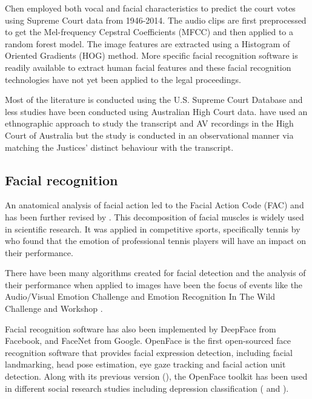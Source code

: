 \documentclass{monashthesis}
\begin{document}
Chen \autocite*{chen2018justice} employed both vocal and facial characteristics to predict the court votes using Supreme Court data from 1946-2014. The audio clips are first preprocessed to get the Mel-frequency Cepstral Coefficients (MFCC) and then applied to a random forest model. The image features are extracted using a Histogram of Oriented Gradients (HOG) method. More specific facial recognition software is readily available to extract human facial features and these facial recognition technologies have not yet been applied to the legal proceedings.

Most of the literature is conducted using the U.S. Supreme Court Database and less studies have been conducted using Australian High Court data. \textcite{tutton2018judicial} have used an ethnographic approach to study the transcript and AV recordings in the High Court of Australia but the study is conducted in an observational manner via matching the Justices' distinct behaviour with the transcript.

\hypertarget{facial-recognition}{%
\subsection{Facial recognition}\label{facial-recognition}}

An anatomical analysis of facial action \autocite{ekman1976measuring} led to the Facial Action Code (FAC) \autocite{ekman1978} and has been further revised by \textcite{ekman2002facial}. This decomposition of facial muscles is widely used in scientific research. It was applied in competitive sports, specifically tennis by \textcite{kovalchik2018going} who found that the emotion of professional tennis players will have an impact on their performance.

There have been many algorithms created for facial detection and the analysis of their performance when applied to images have been the focus of events like the Audio/Visual Emotion Challenge \autocite{schuller2012avec,schuller2011avec} and Emotion Recognition In The Wild Challenge and Workshop \autocite{dhall2013emotion,kahou2013combining}.

Facial recognition software has also been implemented by DeepFace \autocite{taigman2014deepface} from Facebook, and FaceNet \autocite{schroff2015facenet} from Google. OpenFace \autocite{baltrusaitis2018openface} is the first open-sourced face recognition software that provides facial expression detection, including facial landmarking, head pose estimation, eye gaze tracking and facial action unit detection. Along with its previous version (\textcite{baltruvsaitis2016openface}), the OpenFace toolkit has been used in different social research studies including depression classification (\textcite{yang2016decision} and \textcite{nasir2016multimodal}).
\end{document}
